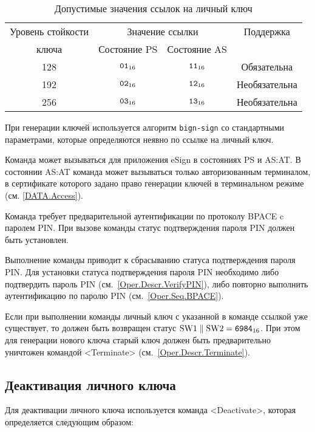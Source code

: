 \begin{table}[hbt]
\caption{Допустимые значения ссылок на личный ключ}
\label{Table.Oper.KeyRef}
\begin{tabular}{|c|c|c|c|}
\hline
Уровень стойкости & \multicolumn{2}{|c|}{Значение ссылки} & Поддержка\\
\cline{2-3}
ключа & Состояние PS & Состояние AS & \\
\hline
\hline
128 & $\texttt{01}_{16}$ & $\texttt{11}_{16}$ & Обязательна \\
192 & $\texttt{02}_{16}$ & $\texttt{12}_{16}$ & Необязательна\\
256 & $\texttt{03}_{16}$ & $\texttt{13}_{16}$ & Необязательна\\
\hline
\end{tabular}
\end{table}

При генерации ключей используется алгоритм \texttt{bign-sign}
со стандартными параметрами, которые определяются неявно
по ссылке на личный ключ. 

Команда может вызываться для приложения eSign в состояниях 
PS и AS:AT. В состоянии AS:AT команда может вызываться 
только авторизованным терминалом, в сертификате которого задано право
генерации ключей в терминальном режиме (см. \ref{DATA.Access}).

Команда требует предварительной аутентификации по 
протоколу BPACE c паролем PIN. При вызове
команды статус подтверждения пароля PIN должен быть 
установлен.

Выполнение команды приводит к сбрасыванию статуса подтверждения пароля PIN.
Для установки статуса подтверждения пароля PIN 
необходимо либо подтвердить пароль PIN (см.~\ref{Oper.Descr.VerifyPIN}), 
либо повторно выполнить аутентификацию по паролю PIN (см.~\ref{Oper.Seq.BPACE}).

Если при выполнении команды личный ключ с указанной в команде ссылкой 
уже существует, то должен быть возвращен статус 
$\text{SW1} \parallel \text{SW2} = \texttt{6984}_{16}$. 
При этом для генерации нового ключа старый ключ должен быть предварительно 
уничтожен командой <Terminate> (см.~\ref{Oper.Descr.Terminate}).

\subsection{Деактивация личного ключа}
\label{Oper.Descr.DeactivateKey} 

Для деактивации личного ключа 
используется команда <Deactivate>,
которая определяется следующим образом:

